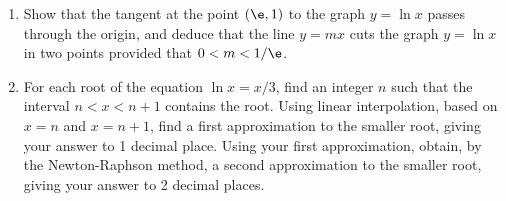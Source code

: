 \clearpage
\begin{problem}
    \begin{enumerate}
        \item Show that the tangent at the point $(\e, 1)$ to the graph $y=\ln x$ passes through the origin, and deduce that the line $y=mx$ cuts the graph $y=\ln x$ in two points provided that $0 < m < 1/\e$.
        \item For each root of the equation $\ln x = x/3$, find an integer $n$ such that the interval $n < x < n+1$ contains the root. Using linear interpolation, based on $x=n$ and $x = n+1$, find a first approximation to the smaller root, giving your answer to 1 decimal place. Using your first approximation, obtain, by the Newton-Raphson method, a second approximation to the smaller root, giving your answer to 2 decimal places.
    \end{enumerate}
\end{problem}

